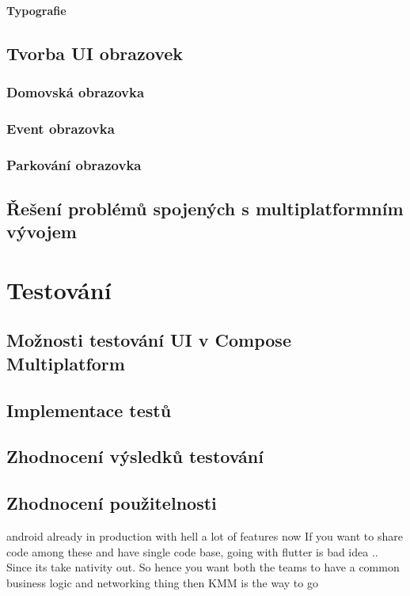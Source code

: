 \subsubsection{Typografie}

\section{Tvorba UI obrazovek}
\subsection{Domovská obrazovka}
\subsection{Event obrazovka}
\subsection{Parkování obrazovka}



\section{Řešení problémů spojených s multiplatformním vývojem}

\chapter{Testování}

\section{Možnosti testování UI v Compose Multiplatform}
\section{Implementace testů}
\section{Zhodnocení výsledků testování}

\section{Zhodnocení použitelnosti}

android already in production with hell a lot of features now If you want to share code among these and have single code base, going with flutter is bad idea .. Since its take nativity out. So hence you want both the teams to have a common business logic and networking thing then KMM is the way to go 

